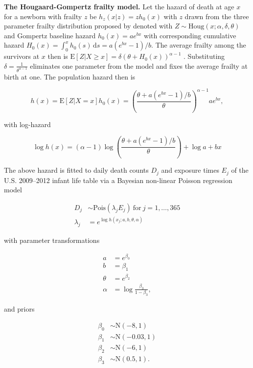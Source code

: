 \documentclass[10pt,twoside,reqno]{article}
\begin{document}
  \textbf{The Hougaard-Gompertz frailty model.}
  Let the hazard of death at age \(x\) for a newborn with frailty \(z\) be \(h_z(x|z)=zh_0(x)\) with \(z\) drawn from the three parameter frailty distribution proposed by \citet{Hougaard1986} denoted with \(Z \sim \text{Houg}(x; \alpha, \delta, \theta)\) and Gompertz baseline hazard \(h_0(x)=ae^{bx}\) with corresponding cumulative hazard \(H_0(x) = \int_0^x h_0(s)\,\text{d}s=a(e^{bx}-1)/b\). The average frailty among the survivors at \(x\) then is \(\text{E}[Z|X\geq x]=\delta\left(\theta + H_0(x)\right)^{\alpha -1}\) \citep[393]{Hougaard1986}. Substituting \(\delta = \frac{1} {\theta^{\alpha-1}}\) eliminates one parameter from the model and fixes the average frailty at birth at one. The population hazard then is

  \[
  h(x)=\text{E}[Z|X=x]h_0(x)=\left(\frac{\theta +   a(e^{bx}-1)/b}{\theta}\right)^{\alpha -1}ae^{bx},
  \]

  with log-hazard

  \[
  \log h(x) =
  (\alpha-1)\log\left(\frac{\theta + a(e^{bx}-1)/b}{\theta}\right) +
  \log a + bx
  \]

  The above hazard is fitted to daily death counts \(D_j\) and exposure times \(E_j\) of the U.S. 2009--2012 infant life table via a Bayesian non-linear Poisson regression model

  \[
  \begin{aligned}
  D_j &\sim \text{Pois}(\lambda_jE_j)~\text{for}~j=1,\ldots,365 \\
  \lambda_j &= e^{\log h(x_j;a,b,\theta,\alpha)}
  \end{aligned}
  \]

  with parameter transformations

  \[
  \begin{aligned}
  a &= e^{\beta_0} \\
  b &= \beta_1 \\
  \theta &= e^{\beta_2} \\
  \alpha &= \log\frac{\beta_3}{1-\beta_3},
  \end{aligned}
  \]

  and priors

  \[
  \begin{aligned}
  \beta_0 &\sim \text{N}(-8, 1) \\
  \beta_1 &\sim \text{N}(-0.03, 1) \\
  \beta_2 &\sim \text{N}(-6, 1) \\
  \beta_3 &\sim \text{N}(0.5, 1).
  \end{aligned}
  \]
\end{document}
